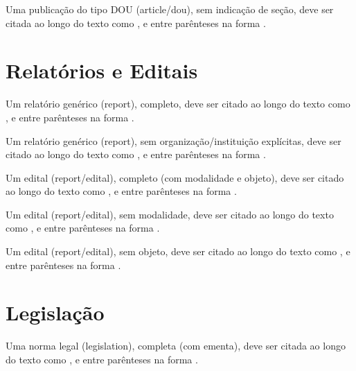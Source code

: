 \documentclass[a4paper,12pt]{article}
\begin{document}

Uma publicação do tipo DOU (article/dou), sem indicação de seção, deve ser citada ao longo do texto como \citet{dou-2-missing-dousection}, e entre parênteses na forma \citep{dou-2-missing-dousection}.



\section*{Relatórios e Editais}

Um relatório genérico (report), completo, deve ser citado ao longo do texto como \citet{rep-1-generic-complete}, e entre parênteses na forma \citep{rep-1-generic-complete}.


Um relatório genérico (report), sem organização/instituição explícitas, deve ser citado ao longo do texto como \citet{rep-2-generic-missing-org}, e entre parênteses na forma \citep{rep-2-generic-missing-org}.


Um edital (report/edital), completo (com modalidade e objeto), deve ser citado ao longo do texto como \citet{edital-1-complete}, e entre parênteses na forma \citep{edital-1-complete}.


Um edital (report/edital), sem modalidade, deve ser citado ao longo do texto como \citet{edital-2-missing-modalidade}, e entre parênteses na forma \citep{edital-2-missing-modalidade}.


Um edital (report/edital), sem objeto, deve ser citado ao longo do texto como \citet{edital-3-missing-objeto}, e entre parênteses na forma \citep{edital-3-missing-objeto}.



\section*{Legislação}

Uma norma legal (legislation), completa (com ementa), deve ser citada ao longo do texto como \citet{leg-1-complete}, e entre parênteses na forma \citep{leg-1-complete}.

\end{document}
